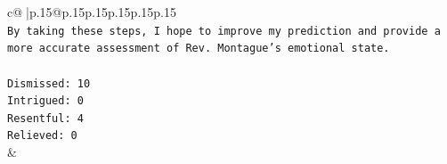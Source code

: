 \documentclass{article}
\begin{document}
{\begin{supertabular}{c@{$\;$}|p{.15\linewidth}@{}p{.15\linewidth}p{.15\linewidth}p{.15\linewidth}p{.15\linewidth}p{.15\linewidth}}
{{{\\ 
\texttt{By taking these steps, I hope to improve my prediction and provide a more accurate assessment of Rev. Montague's emotional state.} \\
\\ 
\texttt{Dismissed: 10} \\
\texttt{Intrigued: 0} \\
\texttt{Resentful: 4} \\
\texttt{Relieved: 0} \\
            }
        }
    }
    & \\ \\

\end{supertabular}
}
\end{document}
